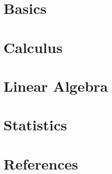 \section[Basics]{Basics}







\section[Calculus]{Calculus}







\section[LinAlg]{Linear Algebra}







\section[Stats]{Statistics}








\section[Refs]{References}


